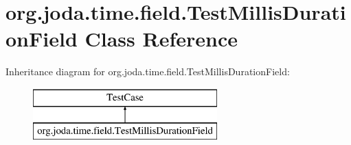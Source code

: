 \hypertarget{classorg_1_1joda_1_1time_1_1field_1_1_test_millis_duration_field}{\section{org.\-joda.\-time.\-field.\-Test\-Millis\-Duration\-Field Class Reference}
\label{classorg_1_1joda_1_1time_1_1field_1_1_test_millis_duration_field}
}
Inheritance diagram for org.\-joda.\-time.\-field.\-Test\-Millis\-Duration\-Field\-:\begin{figure}[H]
\begin{center}
\leavevmode
\includegraphics[height=2.000000cm]{classorg_1_1joda_1_1time_1_1field_1_1_test_millis_duration_field}
\end{center}
\end{figure}
